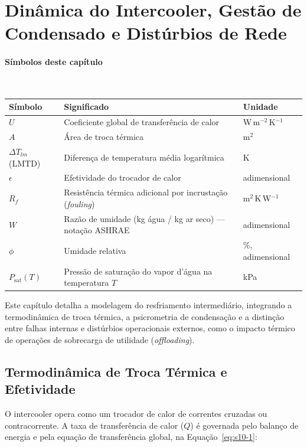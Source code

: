 \documentclass[12pt,a4paper]{article}
\numberwithin{equation}{section}
\numberwithin{table}{section}
\numberwithin{figure}{section}
\begin{document}
	\clearpage
	\section{\textbf{Dinâmica do Intercooler, Gestão de Condensado e Distúrbios de Rede}}

\paragraph{Símbolos deste capítulo}\mbox{}\\[-0.5em]
{\small
\begin{longtable}{>{\raggedright\arraybackslash}p{2.6cm} >{\raggedright\arraybackslash}p{9.2cm} >{\raggedright\arraybackslash}p{2.6cm}}
	\toprule
	\textbf{Símbolo} & \textbf{Significado} & \textbf{Unidade} \\ \midrule
	\endhead
	$U$ & Coeficiente global de transferência de calor & W\,m$^{-2}$\,K$^{-1}$ \\
	$A$ & Área de troca térmica & m$^2$ \\
	$\Delta T_{lm}$ (LMTD) & Diferença de temperatura média logarítmica & K \\
	$\epsilon$ & Efetividade do trocador de calor & adimensional \\
	$R_f$ & Resistência térmica adicional por incrustação (\textit{fouling}) & m$^2$\,K\,W$^{-1}$ \\
	$W$\dag & Razão de umidade (kg água / kg ar seco) — notação ASHRAE & adimensional \\
	$\phi$ & Umidade relativa & \%, adimensional \\
	$P_{\text{sat}}(T)$ & Pressão de saturação do vapor d'água na temperatura $T$ & kPa \\
	\bottomrule
\end{longtable}
}




	
	Este capítulo detalha a modelagem do resfriamento intermediário, integrando a termodinâmica de troca térmica, a psicrometria de condensação e a distinção entre falhas internas e distúrbios operacionais externos, como o impacto térmico de operações de sobrecarga de utilidade (\textit{offloading}).
	
	\subsection{\textbf{Termodinâmica de Troca Térmica e Efetividade}}
	O intercooler opera como um trocador de calor de correntes cruzadas ou contracorrente. A taxa de transferência de calor ($\dot{Q}$) é governada pelo balanço de energia e pela equação de transferência global, na Equação~\eqref{eq:s10-1}:
\end{document}
